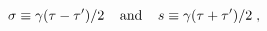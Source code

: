 \begin{equation}
\sigma \equiv \gamma ({\tau-\tau '})/{2}\;\;\;\;{\rm and}\;\;\;\;
s \equiv \gamma({\tau+\tau '})/{2}\;,
\label{CCG}
\end{equation}

